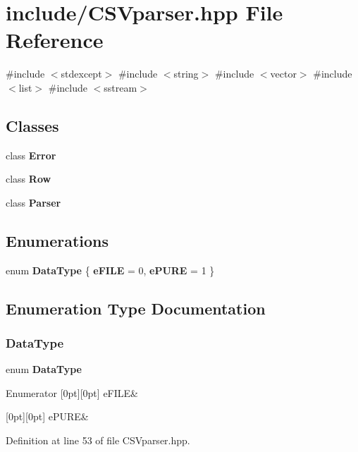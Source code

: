 \section{include/\+C\+S\+Vparser.hpp File Reference}
\label{_c_s_vparser_8hpp}
{\ttfamily \#include $<$stdexcept$>$}\newline
{\ttfamily \#include $<$string$>$}\newline
{\ttfamily \#include $<$vector$>$}\newline
{\ttfamily \#include $<$list$>$}\newline
{\ttfamily \#include $<$sstream$>$}\newline
\subsection*{Classes}
\begin{DoxyCompactItemize}
\item 
class \textbf{ Error}
\item 
class \textbf{ Row}
\item 
class \textbf{ Parser}
\end{DoxyCompactItemize}
\subsection*{Enumerations}
\begin{DoxyCompactItemize}
\item 
enum \textbf{ Data\+Type} \{ \textbf{ e\+F\+I\+LE} = 0, 
\textbf{ e\+P\+U\+RE} = 1
 \}
\end{DoxyCompactItemize}


\subsection{Enumeration Type Documentation}
\mbox{\label{_c_s_vparser_8hpp_ad8ed01ff3ff33333d8e19db4d2818bb6}} 
\subsubsection{DataType}
{\footnotesize\ttfamily enum \textbf{ Data\+Type}}

\begin{DoxyEnumFields}{Enumerator}
[0pt][0pt]{}\mbox{\label{_c_s_vparser_8hpp_ad8ed01ff3ff33333d8e19db4d2818bb6a99e2aefa5a03705fd10b8b72e081349f}} 
e\+F\+I\+LE&\\
\hline

[0pt][0pt]{}\mbox{\label{_c_s_vparser_8hpp_ad8ed01ff3ff33333d8e19db4d2818bb6aef7f347978c58a657566792291ec1e4b}} 
e\+P\+U\+RE&\\
\hline

\end{DoxyEnumFields}


Definition at line 53 of file C\+S\+Vparser.\+hpp.

